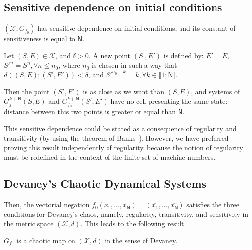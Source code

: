 \subsection{Sensitive dependence on initial conditions}

\label{sensibilite}

\begin{theorem}
$(\mathcal{X},G_{f_0})$ has sensitive dependence on initial conditions, and
its constant of sensitiveness is equal to $\mathsf{N}$.
\end{theorem}

\begin{Proof}
Let $(S,E) \in \mathcal{X}$, and $\delta>0$. A new point $(S',E')$ is defined by: $E'=E$, $S'^n = S^n, \forall n \leqslant n_0$, where $n_0$ is chosen in such a way that $d((S,E);(S',E'))<\delta$, and $S'^{n_0+k} = k, \forall k \in \llbracket 1; \mathsf{N} \rrbracket$.

\noindent Then the point $(S',E')$ is as close as we want than $(S,E)$, and systems of $G_{f_0}^{k+\mathsf{N}}(S,E)$ and $G_{f_0}^{k+\mathsf{N}}(S',E')$ have no cell presenting the same state: distance between this two points is greater or equal than $\mathsf{N}$.
\end{Proof}

\begin{remark}
This sensitive dependence could be stated as a consequence of regularity and
transitivity (by using the theorem of Banks~\cite{Banks92}). However, we have
preferred proving this result independently of regularity, because the
notion of regularity must be redefined in the context of the finite set of
machine numbers.
\end{remark}

\subsection{Devaney's Chaotic Dynamical Systems}
Then, the vectorial negation $f_{0}(x_{1},%
\hdots,x_{\mathsf{N}})=(\overline{x_{1}},\hdots,\overline{x_{\mathsf{N}}})$ satisfies the three conditions for Devaney's chaos, namely, regularity, transitivity, and sensitivity in the metric space $(\mathcal{X},d)$. This leads to the following result.



\begin{proposition}
$G_{f_0}$ is a chaotic map on $(\mathcal{X},d)$ in the sense of Devaney.
\end{proposition}






